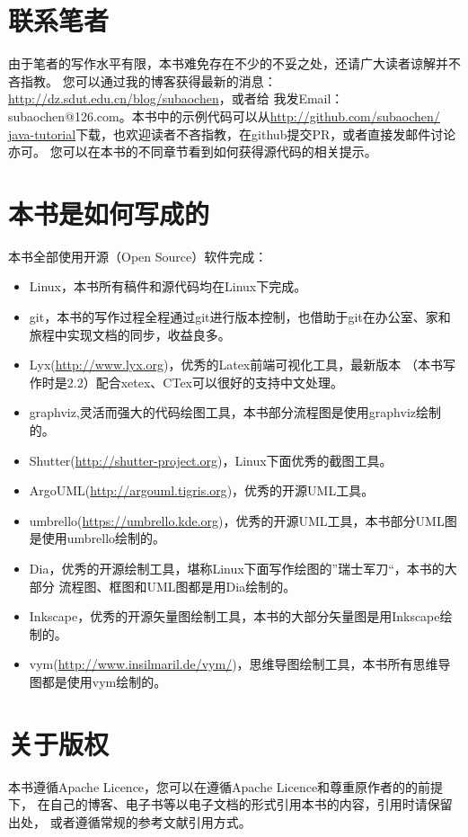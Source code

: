 \section*{联系笔者}
由于笔者的写作水平有限，本书难免存在不少的不妥之处，还请广大读者谅解并不吝指教。
您可以通过我的博客获得最新的消息：\url{http://dz.sdut.edu.cn/blog/subaochen}，或者给
我发Email：subaochen@126.com。本书中的示例代码可以从\url{http://github.com/subaochen/
java-tutorial}下载，也欢迎读者不吝指教，在github提交PR，或者直接发邮件讨论亦可。
您可以在本书的不同章节看到如何获得源代码的相关提示。

\section*{本书是如何写成的}
本书全部使用开源（Open Source）软件完成：
\begin{itemize}
    \item Linux，本书所有稿件和源代码均在Linux下完成。
    \item git，本书的写作过程全程通过git进行版本控制，也借助于git在办公室、家和旅程中实现文档的同步，收益良多。
    \item Lyx(\url{http://www.lyx.org})，优秀的Latex前端可视化工具，最新版本
        （本书写作时是2.2）配合xetex、CTex可以很好的支持中文处理。
    \item graphviz,灵活而强大的代码绘图工具，本书部分流程图是使用graphviz绘制的。
    \item Shutter(\url{http://shutter-project.org})，Linux下面优秀的截图工具。
    \item ArgoUML(\url{http://argouml.tigris.org})，优秀的开源UML工具。
    \item umbrello(\url{https://umbrello.kde.org})，优秀的开源UML工具，本书部分UML图是使用umbrello绘制的。
    \item Dia，优秀的开源绘制工具，堪称Linux下面写作绘图的”瑞士军刀“，本书的大部分
        流程图、框图和UML图都是用Dia绘制的。
    \item Inkscape，优秀的开源矢量图绘制工具，本书的大部分矢量图是用Inkscape绘制的。
    \item vym(\url{http://www.insilmaril.de/vym/})，思维导图绘制工具，本书所有思维导图都是使用vym绘制的。
\end{itemize}

\section*{关于版权}
本书遵循Apache Licence，您可以在遵循Apache Licence和尊重原作者的的前提下，
在自己的博客、电子书等以电子文档的形式引用本书的内容，引用时请保留出处，
或者遵循常规的参考文献引用方式。

